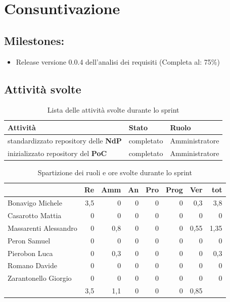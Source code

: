 \section{Consuntivazione}

\subsection{Milestones:}
\begin{itemize}
    \item Release versione 0.0.4 dell'analisi dei requisiti (Completa al: 75\%)
\end{itemize}

\subsection{Attività svolte}

\begin{table}[ht]
    \begin{tabularx}{\textwidth}{X l l}
        
        \rowcolor{gray!30} \textbf{Attività} & \textbf{Stato} & \textbf{Ruolo}\\
        
        \hline
        standardizzato repository delle \textbf{NdP} & completato & Amministratore\\
        inizializzato repository del \textbf{PoC} & completato & Amministratore\\
        \end{tabularx}
    \caption{Lista delle attività svolte durante lo sprint}
\end{table}


\begin{table}[ht]
    \begin{tabularx}{\linewidth}{X|rrrrrrr}
    \rowcolor{gray!30}& Re & Amm & An & Pro & Prog & Ver & tot \\
    \hline
    Bonavigo Michele                        & 3,5 & 0 & 0 & 0 & 0 & 0,3  & 3,8 \\
    \rowcolor{gray!10}Casarotto Mattia      & 0 & 0 & 0 & 0 & 0 & 0  & 0 \\
    Massarenti Alessandro                   & 0 & 0,8 & 0 & 0 & 0 & 0,55  & 1,35 \\
    \rowcolor{gray!10}Peron Samuel          & 0 & 0 & 0 & 0 & 0 & 0 & 0 \\
    Pierobon Luca                           & 0 & 0,3 & 0 & 0 & 0 & 0 & 0,3 \\
    \rowcolor{gray!10}Romano Davide         & 0 & 0 & 0 & 0 & 0 & 0 & 0 \\
    Zarantonello Giorgio                    & 0 & 0 & 0 & 0 & 0 & 0 & 0 \\
    \hline                                  & 3,5 & 1,1 & 0 & 0 & 0 & 0,85 & 
    \end{tabularx}
    \caption{\label{ruoli-persone}Spartizione dei ruoli e ore svolte durante lo sprint}
\end{table}

